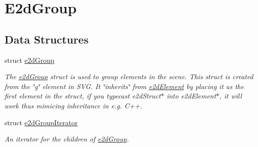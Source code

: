 \hypertarget{group__e2dGroup}{\section{E2d\-Group}
\label{group__e2dGroup}
}
\subsection*{Data Structures}
\begin{DoxyCompactItemize}
\item 
struct \hyperlink{structe2dGroup}{e2d\-Group}
\begin{DoxyCompactList}\small\item\em The \hyperlink{structe2dGroup}{e2d\-Group} struct is used to group elements in the scene. This struct is created from the \char`\"{}g\char`\"{} element in S\-V\-G. It \char`\"{}inherits\char`\"{} from \hyperlink{structe2dElement}{e2d\-Element} by placing it as the first element in the struct, if you typecast e2d\-Struct$\ast$ into e2d\-Element$\ast$, it will work thus mimicing inheritance in e.\-g. C++. \end{DoxyCompactList}\item 
struct \hyperlink{structe2dGroupIterator}{e2d\-Group\-Iterator}
\begin{DoxyCompactList}\small\item\em An iterator for the children of \hyperlink{structe2dGroup}{e2d\-Group}. \end{DoxyCompactList}\end{DoxyCompactItemize}
